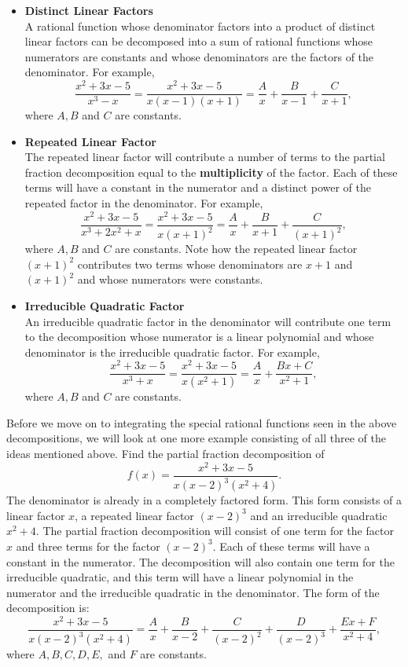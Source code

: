 \documentclass[handout]{ximera}
\begin{document}
\begin{itemize}

\item{\textbf{Distinct Linear Factors}} \\
A rational function whose denominator factors into a product of distinct linear factors
can be decomposed into a sum of rational functions whose numerators are constants and whose denominators are the factors of the denominator.
For example, 
\[
\frac{x^2 + 3x -5}{x^3 -x} = \frac{x^2 + 3x -5}{x(x-1)(x+1)} = \frac{A}{x} + \frac{B}{x-1} + \frac{C}{x+1},
\]
where $A, B$ and $C$ are constants.




\item{\textbf{Repeated Linear Factor}} \\
The repeated linear factor will contribute a number of terms to the partial fraction 
decomposition equal to the \textbf{multiplicity} of the factor. Each of these terms will have a constant in the numerator and a 
distinct power of the repeated factor in the denominator.
For example, 
\[
\frac{x^2 + 3x -5}{x^3 + 2x^2 + x} = \frac{x^2 + 3x -5}{x(x+1)^2} = \frac{A}{x} + \frac{B}{x+1} + \frac{C}{(x+1)^2},
\]
where $A, B$ and $C$ are constants. Note how the repeated linear factor $(x+1)^2$ contributes two terms whose denominators are $x+1$ and $(x+1)^2$
and whose numerators were constants.


\item{\textbf{Irreducible Quadratic Factor}} \\
An irreducible quadratic factor in the denominator will contribute one term to the decomposition whose numerator
is a linear polynomial and whose denominator is the irreducible quadratic factor.
For example, 
\[
\frac{x^2 + 3x -5}{x^3 +x} = \frac{x^2 + 3x -5}{x(x^2+1)} = \frac{A}{x} + \frac{Bx + C}{x^2 + 1},
\]
where $A, B$ and $C$ are constants.


\end{itemize}

Before we move on to integrating the special rational functions seen in the above decompositions, 
we will look at one more example consisting of all three of the ideas mentioned above.
Find the partial fraction decomposition of
\[
  f(x) = \frac{x^2 + 3x -5}{x(x-2)^3(x^2 + 4)}. 
\]
The denominator is already in a completely factored form.  This form consists of a linear factor $x$, 
a repeated linear factor $(x-2)^3$ and an irreducible quadratic $x^2 + 4$. 
The partial fraction decomposition will consist of one term for the factor $x$ and three terms for the factor
$(x-2)^3$.  Each of these terms will have a constant in the numerator.  
The decomposition will also contain one term for the irreducible quadratic, and this term 
will have a linear polynomial in the numerator and the irreducible quadratic in the denominator.
The form of the decomposition is:
\[
  \frac{x^2 + 3x -5}{x(x-2)^3(x^2 + 4)} = \frac{A}{x} + \frac{B}{x-2} + \frac{C}{(x-2)^2} + \frac{D}{(x-2)^3} +\frac{Ex+F}{x^2+4},
\]
where $A, B, C, D, E,$ and $F$ are constants.
\end{document}
